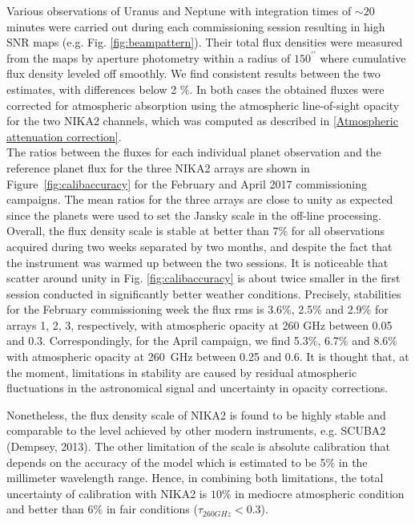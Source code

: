 \documentclass[]{aa} %
\begin{document}
Various observations of Uranus and Neptune with integration times of $\sim 20$ minutes were carried out during each commissioning session resulting in high SNR maps (e.g. Fig. \ref{fig:beampattern}). Their total flux densities were measured from the maps 
by aperture photometry within a radius of  $150^{\prime \prime}$ where cumulative flux density leveled off smoothly. We find consistent results between the two estimates, with differences below 2 \%. In both cases the obtained fluxes were corrected for atmospheric absorption using the atmospheric line-of-sight opacity for the two NIKA2 channels, which was computed as described in \ref{Atmospheric attenuation correction}. \\

The ratios between the fluxes for each individual planet observation and the reference planet flux for the three NIKA2 arrays are shown in Figure~\ref{fig:calibaccuracy} for the February and April 2017 commissioning campaigns.  The mean ratios for the three arrays are close to unity as expected since the planets were used to set the Jansky scale in the off-line processing. Overall, the flux density scale is stable at better than $7\%$ for all observations acquired during two weeks  separated by two months, and despite the fact that the instrument was warmed up between the two sessions. It is noticeable that scatter around unity in Fig. \ref{fig:calibaccuracy}
is about twice smaller in the first session conducted in significantly better weather conditions.
Precisely, stabilities for the February commissioning week the flux rms is 3.6\%, 2.5\% and 2.9\% for arrays 1, 2, 3, respectively, with atmospheric opacity at 260 GHz between 0.05 and 0.3.
Correspondingly, for the April campaign, we find  5.3\%, 6.7\% and 8.6\%  with atmospheric opacity at 260~GHz between 0.25 and 0.6. It is thought that, at the moment, limitations in stability are caused by residual atmospheric fluctuations in the astronomical signal and uncertainty in opacity corrections. 

Nonetheless, the flux density scale of NIKA2 is found to be highly stable and comparable to the level achieved
by other modern instruments, e.g. SCUBA2 (Dempsey, 2013). The other limitation of the scale is absolute calibration that depends on the accuracy of the \cite{moreno2010} model which is estimated to be 5\% in the millimeter wavelength range. Hence, in combining both limitations, the total uncertainty of calibration with NIKA2 is $10\%$ in mediocre atmospheric condition and better than $6\%$ in fair conditions ($\tau_{260 GHz} <0.3$). 
\end{document}
